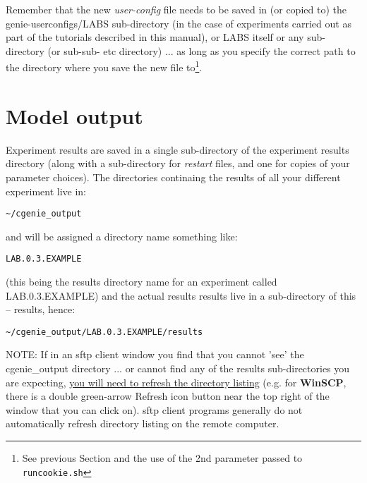 \noindent Remember that the new \textit{user-config} file needs to be saved in (or copied to) the \textsf{\footnotesize genie-userconfigs/LABS} sub-directory (in the case of experiments carried out as part of the tutorials described in this manual), or \textsf{\footnotesize LABS} itself or any sub-directory (or sub-sub- etc directory) ... as long as you specify the correct path to the directory where you save the new file to\footnote{See previous Section and the use of the 2nd parameter passed to \texttt{runcookie.sh}}.

\newpage

\section{Model output}

Experiment results are saved in a single sub-directory of the experiment results directory (along with a sub-directory for \textit{restart} files, and one for copies of your parameter choices). The directories continaing the results of all your different experiment live in:

\vspace{-1mm}\begin{verbatim}
~/cgenie_output
\end{verbatim}\vspace{-1mm}
and will be assigned a directory name something like:

\vspace{-1mm}\begin{verbatim}
LAB.0.3.EXAMPLE
\end{verbatim}\vspace{-1mm}
(this being the results directory name for an experiment called \textsf{\footnotesize LAB.0.3.EXAMPLE}) and the actual results results live in a sub-directory of this -- \textsf{\footnotesize results}, hence:

\vspace{-1mm}\begin{verbatim}
~/cgenie_output/LAB.0.3.EXAMPLE/results
\end{verbatim}\vspace{-1mm}

\noindent NOTE: If in an sftp client window you find that you cannot 'see' the \textsf{\footnotesize cgenie\_output} directory ... or cannot find any of the results sub-directories you are expecting, \uline{you will need to refresh the directory listing} (e.g. for \textbf{WinSCP}, there is a double green-arrow \textsf{\footnotesize Refresh} icon button near the top right of the window that you can click on). sftp client programs generally do not automatically refresh directory listing on the remote computer.

